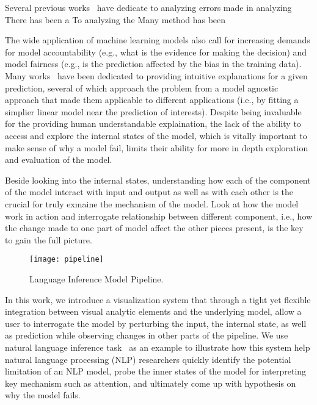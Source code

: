 Several previous works~\cite{BilalJourablooYe2018} have dedicate to analyzing errors made in analyzing 
There has been a
To analyzing the
Many method has been

The wide application of machine learning models also call for increasing demands for model accountability (e.g., what is the evidence for making the decision) and model fairness (e.g., is the prediction affected by the bias in the training data).
%
Many works~\cite{RibeiroSinghGuestrin2016} have been dedicated to providing intuitive explanations for a given prediction, several of which approach the problem from a model agnostic approach that made them applicable to different applications (i.e., by fitting a simplier linear model near the prediction of interests).
%
Despite being invaluable for the providing human understandable explaination, the lack of the ability to access and explore the internal states of the model, which is vitally important to make sense of why a model fail, limits their ability for more in depth exploration and evaluation of the model.


Beside looking into the internal states, understanding how each of the component of the model interact with input and output as well as with each other is the crucial for truly exmaine the mechanism of the model.
%
Look at how the model work in action and interrogate relationship between different component, i.e., how the change made to one part of model affect the other pieces present, is the key to gain the full picture.

\begin{figure}[htbp]
\centering
\vspace{-2mm}
 \texttt{[image: pipeline]}
 \caption{Language Inference Model Pipeline.}
\label{fig:projTransition}
\end{figure}

In this work, we introduce a visualization system that through a tight yet flexible integration between visual analytic elements and the underlying model, allow a user to interrogate the model by perturbing the input, the internal state, as well as prediction while observing changes in other parts of the pipeline.
We use natural language inference task~\cite{BowmanAngeliPotts2015} as an example to illustrate how this system help natural language processing (NLP) researchers quickly identify the potential limitation of an NLP model, probe the inner states of the model for interpreting key mechanism such as attention, and ultimately come up with hypothesis on why the model fails.

